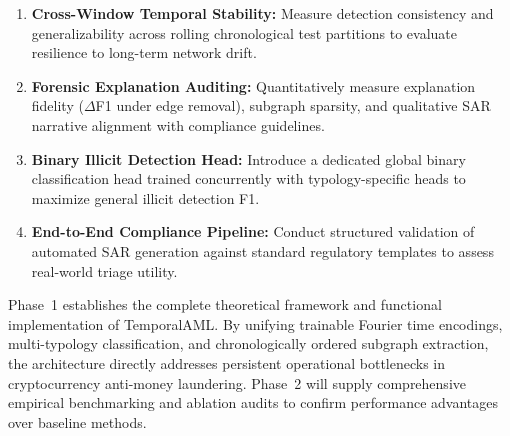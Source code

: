 \begin{enumerate}
    \item \textbf{Cross-Window Temporal Stability:} Measure detection consistency and generalizability across rolling chronological test partitions to evaluate resilience to long-term network drift.

    \item \textbf{Forensic Explanation Auditing:} Quantitatively measure explanation fidelity ($\Delta$F1 under edge removal), subgraph sparsity, and qualitative SAR narrative alignment with compliance guidelines.

    \item \textbf{Binary Illicit Detection Head:} Introduce a dedicated global binary classification head trained concurrently with typology-specific heads to maximize general illicit detection F1.

    \item \textbf{End-to-End Compliance Pipeline:} Conduct structured validation of automated SAR generation against standard regulatory templates to assess real-world triage utility.
\end{enumerate}

\vspace{1em}
\noindent Phase~1 establishes the complete theoretical framework and functional implementation of TemporalAML. By unifying trainable Fourier time encodings, multi-typology classification, and chronologically ordered subgraph extraction, the architecture directly addresses persistent operational bottlenecks in cryptocurrency anti-money laundering. Phase~2 will supply comprehensive empirical benchmarking and ablation audits to confirm performance advantages over baseline methods.
